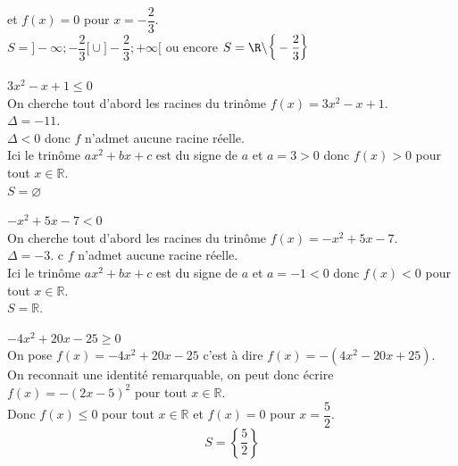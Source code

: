 \documentclass[12pt,a4paper]{book}
\begin{document}
\begin{enumMet}
    et $f(x)=0$ pour $x=-\dfrac{2}{3}$.\\
    $S=\bigg]-\infty ;-\dfrac{2}{3}\bigg[\cup\bigg]-\dfrac{2}{3} ;+\infty\bigg[$ ou encore $S=\R\backslash\bigg\{-\dfrac{2}{3}\bigg\}$
    \item $3 x^{2}-x+1 \leq 0$\\
    On cherche tout d'abord les racines du trinôme $f(x)=3 x^{2}-x+1$.\\
    $\Delta=-11$. \\
    $\Delta<0$ donc $f$ n'admet aucune racine réelle.\\ 
    Ici le trinôme $a x^{2}+b x+c$ est du signe de $a$ et $a=3>0$ donc $f(x)>0$ pour tout $x \in \mathbb{R}$. \\
    $S=\varnothing$
    \item $-x^{2}+5 x-7<0$\\
    On cherche tout d'abord les racines du trinôme $f(x)=-x^{2}+5 x-7$.\\
    $\Delta=-3$. c $f$ n'admet aucune racine réelle.\\ 
    Ici le trinôme $a x^{2}+b x+c$ est du signe de $a$ et $a=-1<0$ donc $f(x)<0$ pour tout $x \in \mathbb{R}$. \\
    $S=\mathbb{R}$.
    \item $-4 x^{2}+20 x-25 \geqslant 0$\\
    On pose $f(x)=-4 x^{2}+20 x-25$ c'est à dire $f(x)=-\left(4 x^{2}-20 x+25\right)$.\\
    On reconnait une identité remarquable, on peut donc écrire $f(x)=-(2 x-5)^{2}$ pour tout $x \in \mathbb{R}$.\\
    Donc $f(x) \leq 0$ pour tout $x \in \mathbb{R}$ et $f(x)=0$ pour $x=\dfrac{5}{2}$.\\ 
    $$
    S=\left\{\dfrac{5}{2}\right\}
    $$  
\end{enumMet}
\end{document}
